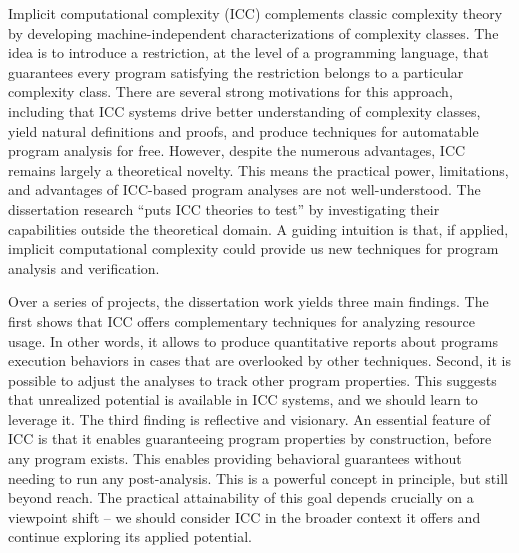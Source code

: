 Implicit computational complexity (ICC) complements classic complexity theory by developing machine-independent characterizations of complexity classes. The idea is to introduce a restriction, at the level of a programming language, that guarantees every program satisfying the restriction belongs to a particular complexity class. There are several strong motivations for this approach, including that ICC systems drive better understanding of complexity classes, yield natural definitions and proofs, and produce techniques for automatable program analysis for free. However, despite the numerous advantages, ICC remains largely a theoretical novelty. This means the practical power, limitations, and advantages of ICC-based program analyses are not well-understood. The dissertation research ``puts ICC theories to test'' by investigating their capabilities outside the theoretical domain. A guiding intuition is that, if applied, implicit computational complexity could provide us new techniques for program analysis and verification.

Over a series of projects, the dissertation work yields three main findings. The first shows that ICC offers complementary techniques for analyzing resource usage. In other words, it allows to produce quantitative reports about programs execution behaviors in cases that are overlooked by other techniques. Second, it is possible to adjust the analyses to track other program properties. This suggests that unrealized potential is available in ICC systems, and we should learn to leverage it. The third finding is reflective and visionary. An essential feature of ICC is that it enables guaranteeing program properties by construction, before any program exists. This enables providing behavioral guarantees without needing to run any post-analysis. This is a powerful concept in principle, but still beyond reach. The practical attainability of this goal depends crucially on a viewpoint shift -- we should consider ICC in the broader context it offers and continue exploring its applied potential.